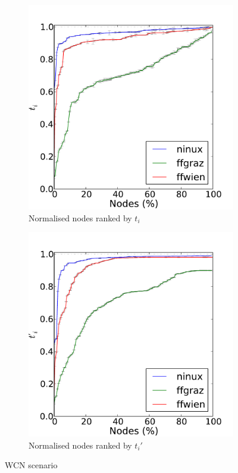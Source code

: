 \documentclass[a4paper,11pt,twoside,openright]{memoir}
\begin{document}
\begin{figure}[htb]
  \centering
  \begin{subfigure}[b]{0.49\textwidth}
    \includegraphics{graphs/all-default-Tc}
    \caption{Normalised nodes ranked by $t_i$}
    \label{fig:mp_wcn_t}
  \end{subfigure}
  \begin{subfigure}[b]{0.49\textwidth}
    \includegraphics{graphs/all-default-Rc}
    \caption{Normalised nodes ranked by $t_i'$}
    \label{fig:mp_wcn_r}
  \end{subfigure}
  \caption{WCN scenario}
  \label{fig:mp_wcn}
\end{figure}
\end{document}
